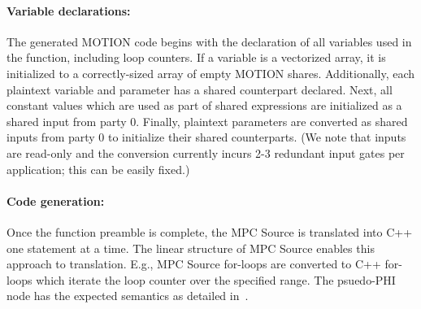 
\squeeze
\paragraph{Variable declarations:}

The generated MOTION code begins with the declaration of all variables used in the function, including loop counters.  If a variable is a vectorized array, it is initialized to a correctly-sized array of empty MOTION shares.  Additionally, each plaintext variable and parameter has a shared counterpart declared.  Next, all constant values which are used as part of shared expressions are initialized as a shared input from party 0. Finally, plaintext parameters are converted as shared inputs from party 0 to initialize their shared counterparts. (We note that inputs are read-only and
the conversion currently incurs 2-3 redundant input gates per application; this can be easily fixed.)

\squeeze
\paragraph{Code generation:}
Once the function preamble is complete, the MPC Source is translated into C++ one statement at a time. The linear structure of MPC Source enables this approach to translation. 
E.g., MPC Source for-loops are converted to C++ for-loops which iterate the loop counter over the specified range. The psuedo-PHI node has the expected semantics as detailed in~\cite{Anon_TR}.

